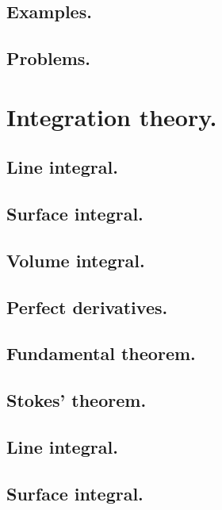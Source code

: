      \subsection{Examples.}
         
      \subsection{Problems.}
         
         
         
   \section{Integration theory.}
      \subsection{Line integral.}
         
      \subsection{Surface integral.}
         
      \subsection{Volume integral.}
         
      \subsection{Perfect derivatives.}
         
      \subsection{Fundamental theorem.}
         
   \subsection{Stokes' theorem.}
      
   \subsection{Line integral.}
      
   \subsection{Surface integral.}
      
